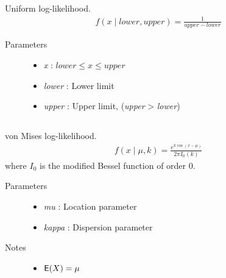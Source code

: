 \documentclass[]{jss}
\begin{document}
\subsection[uniform]{ }


Uniform log-likelihood.
\begin{eqnarray*}
f(x \mid lower, upper) = \frac{1}{upper-lower}    
\end{eqnarray*}

\begin{description}
\item[Parameters] \leavevmode\begin{itemize}
\item {} 
\emph{x} : $lower \leq x \leq upper$

\item {} 
\emph{lower} : Lower limit

\item {} 
\emph{upper} : Upper limit, (\emph{upper} \textgreater{} \emph{lower})

\end{itemize}

\end{description}

\subsection[von Mises]{ }

von Mises log-likelihood.
\begin{eqnarray*}
f(x \mid \mu, k) = \frac{e^{k \cos(x - \mu)}}{2 \pi I_0(k)}    
\end{eqnarray*}
where $I_0$ is the modified Bessel function of order 0.
\begin{description}
\item[Parameters] \leavevmode\begin{itemize}

\item {} 
\emph{mu} : Location parameter

\item {} 
\emph{kappa} : Dispersion parameter

\end{itemize}

\item[Notes]\leavevmode\begin{itemize}
\item {} 
$\mathsf{E}(X) = \mu$

\end{itemize}


\end{description}
\end{document}
